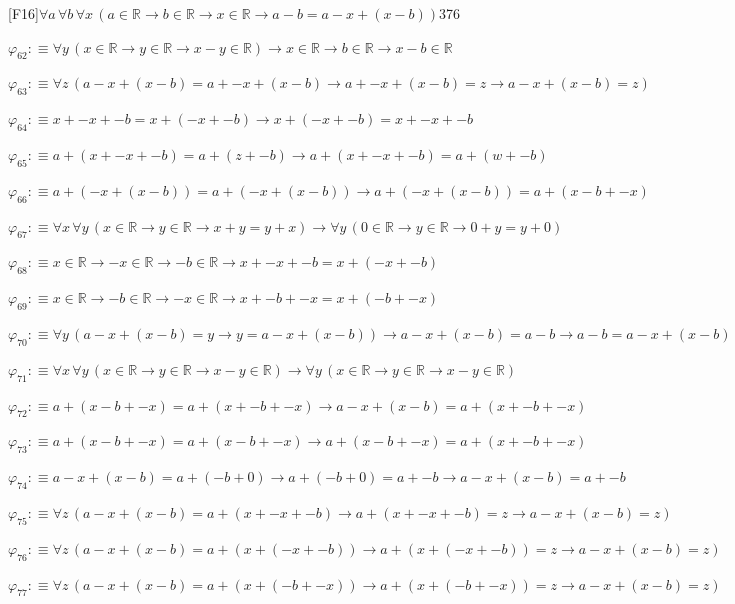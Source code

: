 \begin{fullproof}{[F16]}{$\forall a\,\forall b\,\forall x\,(a \in \mathbb{R} \to b \in \mathbb{R} \to x \in \mathbb{R} \to a - b = a - x + (x - b))$}{376}
\begin{abbrevlist}
\item $\varphi_{62} :\equiv \forall y\,(x \in \mathbb{R} \to y \in \mathbb{R} \to x - y \in \mathbb{R}) \to x \in \mathbb{R} \to b \in \mathbb{R} \to x - b \in \mathbb{R}$
\item $\varphi_{63} :\equiv \forall z\,(a - x + (x - b) = a + -x + (x - b) \to a + -x + (x - b) = z \to a - x + (x - b) = z)$
\item $\varphi_{64} :\equiv x + -x + -b = x + (-x + -b) \to x + (-x + -b) = x + -x + -b$
\item $\varphi_{65} :\equiv a + (x + -x + -b) = a + (z + -b) \to a + (x + -x + -b) = a + (w + -b)$
\item $\varphi_{66} :\equiv a + (-x + (x - b)) = a + (-x + (x - b)) \to a + (-x + (x - b)) = a + (x - b + -x)$
\item $\varphi_{67} :\equiv \forall x\,\forall y\,(x \in \mathbb{R} \to y \in \mathbb{R} \to x + y = y + x) \to \forall y\,(0 \in \mathbb{R} \to y \in \mathbb{R} \to 0 + y = y + 0)$
\item $\varphi_{68} :\equiv x \in \mathbb{R} \to -x \in \mathbb{R} \to -b \in \mathbb{R} \to x + -x + -b = x + (-x + -b)$
\item $\varphi_{69} :\equiv x \in \mathbb{R} \to -b \in \mathbb{R} \to -x \in \mathbb{R} \to x + -b + -x = x + (-b + -x)$
\item $\varphi_{70} :\equiv \forall y\,(a - x + (x - b) = y \to y = a - x + (x - b)) \to a - x + (x - b) = a - b \to a - b = a - x + (x - b)$
\item $\varphi_{71} :\equiv \forall x\,\forall y\,(x \in \mathbb{R} \to y \in \mathbb{R} \to x - y \in \mathbb{R}) \to \forall y\,(x \in \mathbb{R} \to y \in \mathbb{R} \to x - y \in \mathbb{R})$
\item $\varphi_{72} :\equiv a + (x - b + -x) = a + (x + -b + -x) \to a - x + (x - b) = a + (x + -b + -x)$
\item $\varphi_{73} :\equiv a + (x - b + -x) = a + (x - b + -x) \to a + (x - b + -x) = a + (x + -b + -x)$
\item $\varphi_{74} :\equiv a - x + (x - b) = a + (-b + 0) \to a + (-b + 0) = a + -b \to a - x + (x - b) = a + -b$
\item $\varphi_{75} :\equiv \forall z\,(a - x + (x - b) = a + (x + -x + -b) \to a + (x + -x + -b) = z \to a - x + (x - b) = z)$
\item $\varphi_{76} :\equiv \forall z\,(a - x + (x - b) = a + (x + (-x + -b)) \to a + (x + (-x + -b)) = z \to a - x + (x - b) = z)$
\item $\varphi_{77} :\equiv \forall z\,(a - x + (x - b) = a + (x + (-b + -x)) \to a + (x + (-b + -x)) = z \to a - x + (x - b) = z)$

\end{abbrevlist}
\end{fullproof}
